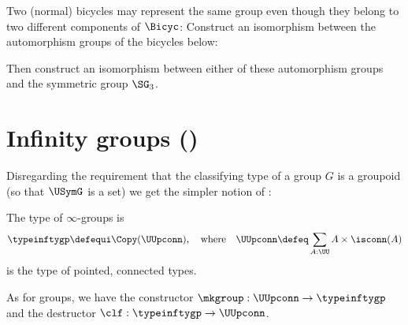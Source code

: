 \begin{xca}\label{xca:normal-bicycle-nonunique}
  Two (normal) bicycles may represent the same group even though they belong to
  two different components of $\Bicyc$:
  Construct an isomorphism between the automorphism groups of the bicycles below:
  \begin{center}
    \hspace{1cm}
  \end{center}
  Then construct an isomorphism between either of these automorphism groups
  and the symmetric group $\SG_3$.
\end{xca}

\section{Infinity groups (\texorpdfstring{\inftygps}{∞-groups})}
\label{sec:inftygps}

Disregarding the requirement that the classifying type
of a group $G$ is a groupoid (so that $\USymG$ is a set)
we get the simpler notion of \inftygps:
\begin{definition}\label{def:inftygps}
  The type of $\infty$-groups is
  \[
    \typeinftygp\defequi \Copy(\UUpconn),
    \quad\text{where}\quad
    \UUpconn\defeq \sum_{A:\UU} A\times \isconn(A)
  \]
  is the type of pointed, connected types.

  As for groups, we have the constructor 
  $\mkgroup : \UUpconn \to \typeinftygp$
  and the destructor $\clf : \typeinftygp \to \UUpconn$.
\end{definition}

